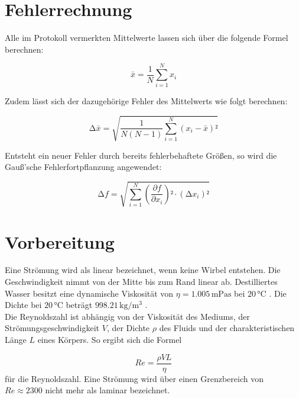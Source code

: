 \noindent

  \section{Fehlerrechnung}
  \label{sec:Fehlerrechnung}
  
  Alle im Protokoll vermerkten Mittelwerte lassen sich über die folgende Formel berechnen:
  
  \begin{equation}
  \label{eqn:Mittelwert}
      \bar{x} = \frac{1}{N}\sum_{i=1}^N x_i
  \end{equation}
  
  \noindent
  Zudem lässt sich der dazugehörige Fehler des Mittelwerts wie folgt berechnen:
  
  \begin{equation}
  \label{eqn:Mittelwertfehler}
      \increment \bar{x} = \sqrt{\frac{1}{N\left(N-1\right)}\sum_{i=1}^N \left(x_i - \bar{x}\right)²}
  \end{equation}
  
  \noindent
  Entsteht ein neuer Fehler durch bereits fehlerbehaftete Größen, so wird die Gauß'sche Fehlerfortpflanzung angewendet:
  
  \begin{equation}
  \label{eqn:Fehlerfortpflanzung}
      \increment f = \sqrt{\sum_{i=1}^N \left(\frac{\partial f}{\partial x_i}\right)²\cdot\left(\increment x_i\right)²}
  \end{equation}
  
  \section{Vorbereitung}
  Eine Strömung wird als linear bezeichnet, wenn keine Wirbel entstehen. Die Geschwindigkeit nimmt von der Mitte bis zum Rand linear ab.
  Destilliertes Wasser besitzt eine dynamische Viskosität von $\eta = 1.005\, \unit{\milli \pascal \second}$ bei $20\, \unit{\celsius}$ 
  \cite[290]{Physikalisches_Praktikum}. Die Dichte bei $20\, \unit{\celsius}$ beträgt $998.21\, \unit{\kilo \gram \per \cubic \meter}$
  \cite{Physikalisches_Praktikum}.\\
  \noindent
  Die Reynoldszahl ist abhängig von der Viskosität des Mediums, der Strömungsgeschwindigkeit $V$, der Dichte $\rho$ des Fluids und der 
  charakteristischen Länge $L$ eines Körpers. So ergibt sich die Formel 
  
  \begin{equation}
      Re = \frac{\rho V L}{\eta}
      \label{eqn:Reynolds}
  \end{equation}
  für die Reynoldszahl. Eine Strömung wird über einen Grenzbereich von $Re \approx 2300$ \cite{Reynolds} nicht mehr als laminar bezeichnet.

%

